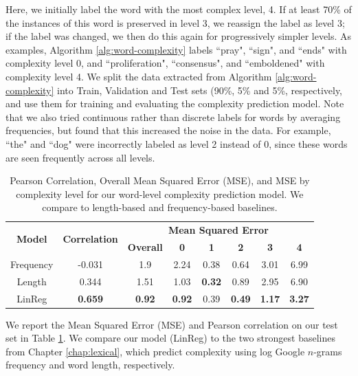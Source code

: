 \documentclass[thesis.tex]{subfiles}
\begin{document}
Here, we initially label the word with the most complex level, 4. If at least 70\% of the instances of this word is preserved in level 3, we reassign the label as level 3; if the label was changed, we then do this again for progressively simpler levels. As examples, Algorithm \ref{alg:word-complexity} labels ``pray", ``sign", and ``ends" with complexity level 0, and ``proliferation", ``consensus", and ``emboldened" with complexity level 4. We split the data extracted from Algorithm \ref{alg:word-complexity} into Train, Validation and Test sets (90\%, 5\% and 5\%, respectively, and use them for training and evaluating the complexity prediction model. Note that we also tried continuous rather than discrete labels for words by averaging frequencies, but found that this increased the noise in the data. For example, ``the" and ``dog" were incorrectly labeled as level 2 instead of 0, since these words are seen frequently across all levels.

\begin{table}
\begin{center}
\begin{tabular}{|c|c|cccccc|} \hline \multirow{2}{*}{\textbf{Model}} & \multirow{2}{*}{\textbf{Correlation}} & \multicolumn{6}{c|}{\textbf{Mean Squared Error}} \\
& & \textbf{Overall} & \textbf{0} & \textbf{1} & \textbf{2} & \textbf{3} & \textbf{4} \\ \hline
Frequency & -0.031 & 1.9 & 2.24 & 0.38 & 0.64 & 3.01 & 6.99\\
Length & 0.344 & 1.51 & 1.03 & \textbf{0.32} & 0.89 & 2.95 & 6.90 \\
LinReg & \textbf{0.659} & \textbf{0.92} & \textbf{0.92} & 0.39 & \textbf{0.49} & \textbf{1.17} & \textbf{3.27} \\ \hline
\end{tabular}
\end{center}
\caption{\label{word-comp} Pearson Correlation, Overall Mean Squared Error (MSE), and MSE by complexity level for our word-level complexity prediction model. We compare to length-based and frequency-based baselines.}
\end{table}

We report the Mean Squared Error (MSE) and Pearson correlation on our test set in Table \ref{word-comp}. We compare our model (LinReg) to the two strongest baselines from Chapter \ref{chap:lexical}, which predict complexity using log Google $n$-grams frequency \citep{thorsten2006web} and word length, respectively.
\end{document}
